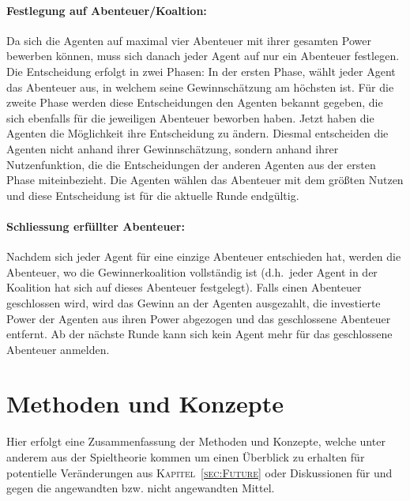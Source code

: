 \documentclass[fleqn,10pt]{SelfArx} %
\newcommand{\ChapterCite}[1]{\textsc{Kapitel~\ref{#1}}}
\begin{document}
\paragraph{Festlegung auf Abenteuer/Koaltion:}
Da sich die Agenten auf maximal vier Abenteuer mit ihrer gesamten Power bewerben können, muss sich danach jeder Agent auf nur ein Abenteuer festlegen. Die Entscheidung erfolgt in zwei Phasen: In der ersten Phase, wählt jeder Agent das Abenteuer aus, in welchem seine Gewinnschätzung am höchsten ist. Für die zweite Phase werden diese Entscheidungen den Agenten bekannt gegeben, die sich ebenfalls für die jeweiligen Abenteuer beworben haben. Jetzt haben die Agenten die Möglichkeit ihre Entscheidung zu ändern. Diesmal entscheiden die Agenten nicht anhand ihrer Gewinnschätzung, sondern anhand ihrer Nutzenfunktion, die die Entscheidungen der anderen Agenten aus der ersten Phase miteinbezieht. Die Agenten wählen das Abenteuer mit dem größten Nutzen und diese Entscheidung ist für die aktuelle Runde endgültig.

\paragraph{Schliessung erfüllter Abenteuer:}
Nachdem sich jeder Agent für eine einzige Abenteuer entschieden hat, werden die Abenteuer, wo die Gewinnerkoalition vollständig ist (d.h.\ jeder Agent in der Koalition hat sich auf dieses Abenteuer festgelegt). Falls einen Abenteuer geschlossen wird, wird das Gewinn an der Agenten ausgezahlt, die investierte Power der Agenten aus ihren Power abgezogen und das geschlossene Abenteuer entfernt. Ab der nächste Runde kann sich kein Agent mehr für das geschlossene Abenteuer anmelden.

\section{Methoden und Konzepte}
\label{sec:Methoden}
Hier erfolgt eine Zusammenfassung der Methoden und Konzepte, welche unter anderem aus der Spieltheorie kommen um einen Überblick zu erhalten für potentielle Veränderungen aus \ChapterCite{sec:Future} oder Diskussionen für und gegen die angewandten bzw. nicht angewandten Mittel.
\end{document}
